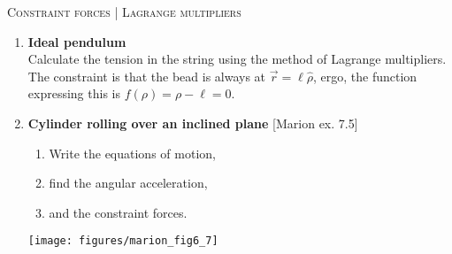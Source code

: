 \documentclass[11pt, a4paper, twoside]{article}
\begin{document}
\begin{center}
  \textsc{\large Constraint forces | Lagrange multipliers} 
\end{center}

\begin{enumerate}

	\item
	\begin{minipage}[t][1.1cm]{0.75\textwidth}
		\textbf{Ideal pendulum}\\
		Calculate the tension in the string using the method of Lagrange multipliers.
		The constraint is that the bead is always at \(\vec{r} = \ell \hat{\rho}\), ergo, the function expressing this is \(f(\rho) = \rho - \ell = 0\).
	\end{minipage}
	\begin{minipage}[c][0cm][t]{0.25\textwidth}
		
	\end{minipage}



	\item 
	\begin{minipage}[t][4cm]{0.47\textwidth}
	\textbf{Cylinder rolling over an inclined plane} [Marion ex. 7.5]\\
		\begin{enumerate}
			\item Write the equations of motion,
			\item find the angular acceleration,
			\item and the constraint forces.
		\end{enumerate}
	\end{minipage}
	\begin{minipage}[c][2.5cm][t]{0.3\textwidth}
		\texttt{[image: figures/marion\_fig6\_7]}
	\end{minipage}


\end{enumerate}
\end{document}
